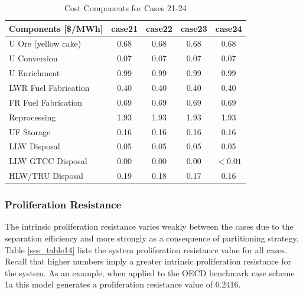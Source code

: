 \begin{table}[htbp]
\begin{center}
\caption{Cost Components for Cases 21-24}
\label{ses_table13_2}
\begin{tabular}{|l|c|c|c|c|}
\hline
\textbf{Components [\$/MWh]} & \textbf{case21} & \textbf{case22} & \textbf{case23} & \textbf{case24} \\
\hline
U Ore (yellow cake)          & 0.68            & 0.68            & 0.68            & 0.68 \\
U Conversion                 & 0.07            & 0.07            & 0.07            & 0.07 \\
U Enrichment                 & 0.99            & 0.99            & 0.99            & 0.99 \\
LWR Fuel Fabrication         & 0.40            & 0.40            & 0.40            & 0.40 \\
FR Fuel Fabrication          & 0.69            & 0.69            & 0.69            & 0.69 \\
Reprocessing                 & 1.93            & 1.93            & 1.93            & 1.93 \\
UF Storage                   & 0.16            & 0.16            & 0.16            & 0.16 \\
LLW Disposal                 & 0.05            & 0.05            & 0.05            & 0.05 \\
LLW GTCC Disposal            & 0.00            & 0.00            & 0.00            & $<0.01$ \\
HLW/TRU Disposal             & 0.19            & 0.18            & 0.17            & 0.16 \\
\hline
\end{tabular}
\end{center}
\end{table}



\subsubsection{Proliferation Resistance}
\label{ses_sec:prilif_res}
The intrinsic proliferation resistance varies weakly between the cases
due to the separation efficiency and more strongly as a consequence of
partitioning strategy.  Table \ref{ses_table14} lists the system proliferation
resistance value for all cases.  Recall that higher numbers imply a
greater intrinsic proliferation resistance for the system.  
As an example, when applied to the OECD benchmark case
scheme 1a this model generates a proliferation resistance
value of 0.2416.


